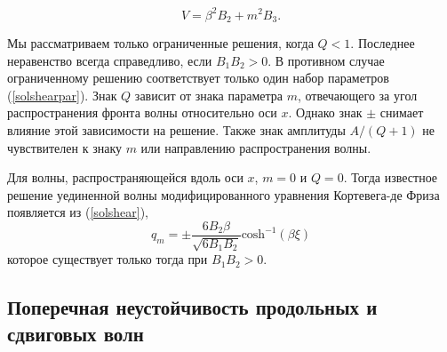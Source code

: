 \begin{equation}
V=\beta^2 B_2+m^2 B_3.\label{solshearpar}
\end{equation}

Мы рассматриваем только ограниченные решения, когда $Q<1$. Последнее неравенство всегда справедливо, если $B_1 B_2> 0$. В противном случае ограниченному решению соответствует только один набор параметров (\ref{solshearpar}). Знак $Q$ зависит от знака параметра $ m $, отвечающего за угол распространения фронта волны относительно оси $x$. Однако знак $\pm$ снимает влияние этой зависимости на решение. Также знак амплитуды $A / (Q + 1)$ не чувствителен к знаку $m$ или направлению распространения волны.

Для волны, распространяющейся вдоль оси $ x $, $ m = 0 $ и $ Q = 0 $. Тогда известное решение уединенной волны модифицированного уравнения Кортевега-де Фриза появляется из (\ref {solshear}),
\begin{equation}
	q_m=\pm \frac{6B_2 \beta}{\sqrt{6 B_1 B_2}}{\text{cosh}}^{-1}(\beta \xi) \label{qp}
\end{equation}
которое существует только тогда при $ B_1 B_2 > 0 $.

\subsection{Поперечная неустойчивость продольных и сдвиговых волн}

